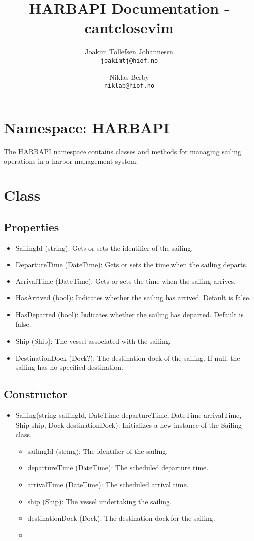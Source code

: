 \documentclass[12pt]{article}
\title{HARBAPI Documentation - cantclosevim}
\author{
    Joakim Tollefsen Johannesen\\
    \texttt{joakimtj@hiof.no}
    \and
    Niklas Berby\\
    \texttt{niklab@hiof.no}
}
\begin{document}
\maketitle

\section{Namespace: HARBAPI}

The HARBAPI namespace contains classes and methods for managing sailing operations in a harbor management system.

\section*{Class}

\subsection*{Properties}
\begin{itemize}
    \item SailingId (string): Gets or sets the identifier of the sailing.
    \item DepartureTime (DateTime): Gets or sets the time when the sailing departs.
    \item ArrivalTime (DateTime): Gets or sets the time when the sailing arrives.
    \item HasArrived (bool): Indicates whether the sailing has arrived. Default is false.
    \item HasDeparted (bool): Indicates whether the sailing has departed. Default is false.
    \item Ship (Ship): The vessel associated with the sailing.
    \item DestinationDock (Dock?): The destination dock of the sailing. If null, the sailing has no specified destination.
\end{itemize}
\subsection*{Constructor}
\begin{itemize}
    \item Sailing(string sailingId, DateTime departureTime, DateTime arrivalTime, Ship ship, Dock destinationDock): Initializes a new instance of the Sailing class.
    \begin{itemize}
        \item sailingId (string): The identifier of the sailing.
        \item departureTime (DateTime): The scheduled departure time.
        \item arrivalTime (DateTime): The scheduled arrival time.
        \item ship (Ship): The vessel undertaking the sailing.
        \item destinationDock (Dock): The destination dock for the sailing.
        \item 
    \end{itemize}
\end{itemize}
\end{document}
